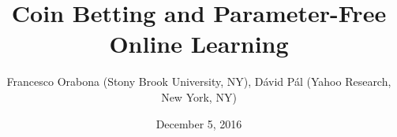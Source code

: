 \documentclass[largefonts,landscape]{sciposter}
\begin{document}
\renewcommand{\thefootnote}{\fnsymbol{footnote}}
\renewcommand{\footlogo}{Typeset by pdf\LaTeX}
\renewcommand{\algorithmicrequire}{\textbf{Input:}}

\title{Coin Betting and Parameter-Free Online Learning}
\author{Francesco Orabona (Stony Brook University, NY), D\'avid P\'al (Yahoo Research, New York, NY)}

\date{December 5, 2016}


\maketitle
\end{document}
